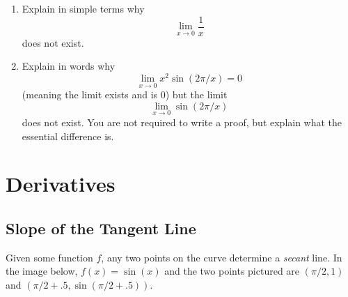 \documentclass[11pt]{book}
\numberwithin{example}{chapter}
\begin{document}
\begin{enumerate}
\begin{enumerate}
\end{enumerate}

\item

Explain in simple terms why $$\lim_{x\to 0} \frac{1}{x}$$ does not exist.  



\item
Explain in words why $$\lim_{x\to 0} x^2 \sin(2\pi/x)=0$$ (meaning the limit exists and is 0) but the limit $$\lim_{x\to 0} \sin(2\pi/x)$$ does not exist.  You are not required to write a proof, but explain what the essential difference is.









\end{enumerate}




\chapter{Derivatives}  

\section{Slope of the Tangent Line}

Given some function $f$, any two points on the curve determine a \emph{secant} line.  In the image below, $f(x)=\sin(x)$ and the two points pictured are $(\pi/2,1)$ and $(\pi/2+.5,\sin(\pi/2+.5))$.  


\begin{center}
\end{center}
\end{document}
